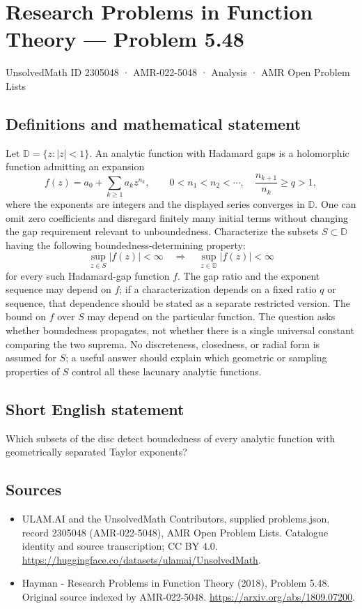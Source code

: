 \documentclass[11pt,a4paper]{article}
\begin{document}
\section*{Research Problems in Function Theory — Problem 5.48}\label{2305048}
{\small UnsolvedMath ID 2305048 · AMR-022-5048 · Analysis · AMR Open Problem Lists}
\subsection{Definitions and mathematical statement}
Let $\mathbb D=\{z:|z|<1\}$. An analytic function with Hadamard gaps is a holomorphic function admitting an expansion
\[
f(z)=a_0+\sum_{k\ge1}a_kz^{n_k},\qquad
0<n_1<n_2<\cdots,\quad
\frac{n_{k+1}}{n_k}\ge q>1,
\]
where the exponents are integers and the displayed series converges in $\mathbb D$. One can omit zero coefficients and disregard finitely many initial terms without changing the gap requirement relevant to unboundedness.
Characterize the subsets $S\subset\mathbb D$ having the following boundedness-determining property:
\[
\sup_{z\in S}|f(z)|<\infty
\quad\Longrightarrow\quad
\sup_{z\in\mathbb D}|f(z)|<\infty
\]
for every such Hadamard-gap function $f$. The gap ratio and the exponent sequence may depend on $f$; if a characterization depends on a fixed ratio $q$ or sequence, that dependence should be stated as a separate restricted version.
The bound on $f$ over $S$ may depend on the particular function. The question asks whether boundedness propagates, not whether there is a single universal constant comparing the two suprema. No discreteness, closedness, or radial form is assumed for $S$; a useful answer should explain which geometric or sampling properties of $S$ control all these lacunary analytic functions.
\subsection{Short English statement}
Which subsets of the disc detect boundedness of every analytic function with geometrically separated Taylor exponents?
\subsection{Sources}
\begin{itemize}
\item[S1] ULAM.AI and the UnsolvedMath Contributors, supplied problems.json, record 2305048 (AMR-022-5048), AMR Open Problem Lists. Catalogue identity and source transcription; CC BY 4.0.
\url{https://huggingface.co/datasets/ulamai/UnsolvedMath}.
\item[S2] Hayman - Research Problems in Function Theory (2018), Problem 5.48. Original source indexed by AMR-022-5048.
\url{https://arxiv.org/abs/1809.07200}.
\end{itemize}
\end{document}
